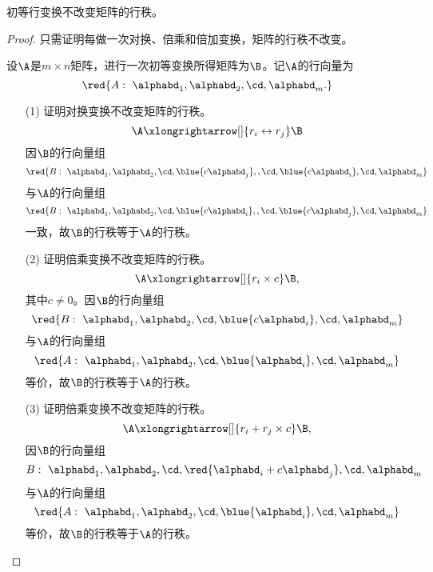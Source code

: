 \begin{dingli}
  初等行变换不改变矩阵的行秩。
\end{dingli}
\begin{proof}
  只需证明每做一次对换、倍乘和倍加变换，矩阵的行秩不改变。    
  \vspace{0.1in}

  设$\A$是$m\times n$矩阵，进行一次初等变换所得矩阵为$\B$。记$\A$的行向量为
  $$\red{A:~\alphabd_1,\alphabd_2,\cd,\alphabd_m.}$$      
  \begin{itemize}
  \item[(1)] 证明对换变换不改变矩阵的行秩。 
    $$
    \A \xlongrightarrow[]{r_i\leftrightarrow r_j}\B
    $$
    因$\B$的行向量组
    $$\red{B:~\alphabd_1,\alphabd_2,\cd,\blue{c\alphabd_j},,\cd,\blue{c\alphabd_i},\cd,\alphabd_m}$$
    与$\A$的行向量组$$\red{B:~\alphabd_1,\alphabd_2,\cd,\blue{c\alphabd_i},,\cd,\blue{c\alphabd_j},\cd,\alphabd_m}$$
    一致，故$\B$的行秩等于$\A$的行秩。 \\[0.1in] 
  \end{itemize}
  




  
  \begin{itemize}
  \item[(2)] 证明倍乘变换不改变矩阵的行秩。 
    $$
    \A \xlongrightarrow[]{r_i\times c }\B,
    $$
    其中$c\ne 0$。因$\B$的行向量组
    $$\red{B:~\alphabd_1,\alphabd_2,\cd,\blue{c\alphabd_i},\cd,\alphabd_m}$$
    与$\A$的行向量组
    $$\red{A:~\alphabd_1,\alphabd_2,\cd,\blue{\alphabd_i},\cd,\alphabd_m}$$
    等价，故$\B$的行秩等于$\A$的行秩。
  \end{itemize}
  



  
  \begin{itemize}
  \item[(3)] 证明倍乘变换不改变矩阵的行秩。 
    $$
    \A \xlongrightarrow[]{r_i+ r_j \times c  }\B,
    $$
    因$\B$的行向量组
    $$B:~\alphabd_1,\alphabd_2,\cd,\red{\alphabd_i+c\alphabd_j},\cd,\alphabd_m$$
    与$\A$的行向量组
    $$\red{A:~\alphabd_1,\alphabd_2,\cd,\blue{\alphabd_i},\cd,\alphabd_m}$$
    等价，故$\B$的行秩等于$\A$的行秩。
  \end{itemize}
\end{proof}





